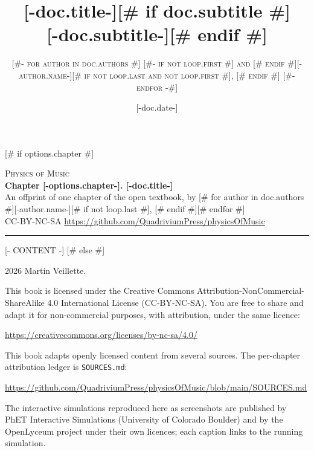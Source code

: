 \documentclass[letterpaper,11pt]{article}
[# else #]
\title{\Huge \textbf{[-doc.title-]}[# if doc.subtitle #] \\[0.5em] \huge [-doc.subtitle-][# endif #]}
\author{\textsc{
[#- for author in doc.authors #]
  [#- if not loop.first #] and [# endif #][-author.name-][# if not loop.last and not loop.first #], [# endif #]
[#- endfor -#]
}}
[# if doc.date #]\date{[-doc.date-]}[# endif #]
\begin{document}
\sloppy

[# if options.chapter #]
\thispagestyle{plain}
\begin{center}
  {\small\scshape\color{mpgray} Physics of Music}\\[0.35em]
  {\LARGE\bfseries Chapter [-options.chapter-]. [-doc.title-]}\\[0.6em]
  {\small An offprint of one chapter of the open textbook, by
   [# for author in doc.authors #][-author.name-][# if not loop.last #], [# endif #][# endfor #]}\\[0.2em]
  {\small\color{mpgray} CC\--BY\--NC\--SA \textperiodcentered{}
   \url{https://github.com/QuadriviumPress/physicsOfMusic}}
\end{center}
\vspace{1em}
\hrule
\vspace{1.5em}

[- CONTENT -]
[# else #]
\frontmatter
\hypersetup{pageanchor=false}
\maketitle

\thispagestyle{empty}
\null\vfill
\noindent\small
\textcopyright{} 2026 Martin Veillette.\par\medskip
\noindent This book is licensed under the Creative Commons
Attribution\--NonCommercial\--ShareAlike 4.0 International License
(CC\--BY\--NC\--SA). You are free to share and adapt it for
non-commercial purposes, with attribution, under the same licence:\par\smallskip
\noindent\url{https://creativecommons.org/licenses/by-nc-sa/4.0/}\par\medskip
\noindent This book adapts openly licensed content from several sources. The
per-chapter attribution ledger is \texttt{SOURCES.md}:\par\smallskip
\noindent\url{https://github.com/QuadriviumPress/physicsOfMusic/blob/main/SOURCES.md}
\par\medskip
\noindent The interactive simulations reproduced here as screenshots are
published by PhET Interactive Simulations (University of Colorado Boulder) and
by the OpenLyceum project under their own licences; each caption links to the
running simulation.
\par\vfill\normalsize
\end{document}
